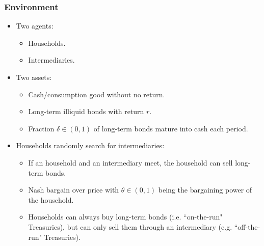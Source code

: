 \documentclass[handout]{beamer}
\begin{document}
\begin{frame}
\frametitle{Environment}

\begin{itemize}[<+->]

\item Two agents: 
\begin{itemize}[<+->]

\item Households.
\item Intermediaries.

\end{itemize}

\bigskip

\item Two assets:

\begin{itemize}[<+->]

\item Cash/consumption good without no return.
\item Long-term illiquid bonds with return $r$. 
\item Fraction $\delta \in (0, 1)$ of long-term bonds mature into cash each period. 

\end{itemize}

\bigskip

\item Households randomly search for intermediaries:

\begin{itemize}[<+->]

\item If an household and an intermediary meet, the household can sell long-term bonds.
\item Nash bargain over price with $\theta \in (0, 1)$ being the bargaining power of the household. 
\item Households can always buy long-term bonds (i.e. ``on-the-run" Treasuries), but can only sell them through an intermediary (e.g. ``off-the-run" Treasuries).

\end{itemize}

\end{itemize}

\end{frame}
\end{document}
